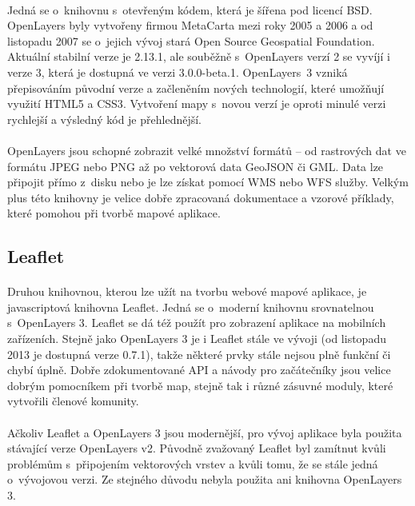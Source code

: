 \documentclass[11pt,a4paper,titlepage,oneside]{book}
\begin{document}
			\paragraph{} Jedná se o~knihovnu s~otevřeným kódem, která je šířena pod licencí BSD. OpenLayers byly vytvořeny firmou MetaCarta mezi roky 2005 a 2006 a od listopadu 2007 se o~jejich vývoj stará Open Source Geospatial Foundation\cite{wiki_ol}. Aktuální stabilní verze je 2.13.1, ale souběžně s~OpenLayers verzí 2 se vyvíjí i verze 3, která je dostupná ve verzi 3.0.0-beta.1. OpenLayers~3 vzniká přepisováním původní verze a začleněním nových technologií, které umožňují využití HTML5 a CSS3\cite{ol}. Vytvoření mapy s~novou verzí je oproti minulé verzi rychlejší a výsledný kód je přehlednější.
			\paragraph{}OpenLayers jsou schopné zobrazit velké množství formátů -- od rastrových dat ve formátu JPEG nebo PNG až po vektorová data GeoJSON či GML. Data lze připojit přímo z~disku nebo je lze získat pomocí WMS nebo WFS služby. Velkým plus této knihovny je velice dobře zpracovaná dokumentace a vzorové příklady, které pomohou při tvorbě mapové aplikace. 
		\subsection{Leaflet}
			\paragraph{} Druhou knihovnou, kterou lze užít na tvorbu webové mapové aplikace, je javascriptová knihovna Leaflet. Jedná se o~moderní knihovnu srovnatelnou s~OpenLayers 3. Leaflet se dá též použít pro zobrazení aplikace na mobilních zařízeních. Stejně jako OpenLayers 3 je i Leaflet stále ve vývoji (od listopadu 2013 je dostupná verze 0.7.1)\cite{Leaflet}, takže některé prvky stále nejsou plně funkční či chybí úplně. Dobře zdokumentované API a návody pro začátečníky jsou velice dobrým pomocníkem při tvorbě map, stejně tak i různé zásuvné moduly, které vytvořili členové komunity.
		\paragraph{} Ačkoliv Leaflet a OpenLayers 3 jsou modernější, pro vývoj aplikace byla použita stávající verze OpenLayers v2. Původně zvažovaný Leaflet byl zamítnut kvůli problémům s~připojením vektorových vrstev a kvůli tomu, že se stále jedná o~vývojovou verzi. Ze stejného důvodu nebyla použita ani knihovna OpenLayers 3.
\end{document}

